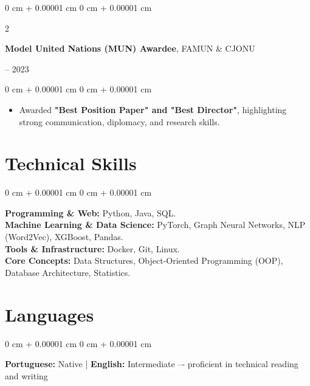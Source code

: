 \documentclass[10pt, letterpaper]{article}
\newenvironment{highlights}{
    \begin{itemize}[
        topsep=0.10 cm,
        parsep=0.10 cm,
        partopsep=0pt,
        itemsep=0pt,
        leftmargin=0 cm + 10pt
    ]
}{
    \end{itemize}
} %
\newenvironment{onecolentry}{
    \begin{adjustwidth}{
        0 cm + 0.00001 cm
    }{
        0 cm + 0.00001 cm
    }
}{
    \end{adjustwidth}
} %
\newenvironment{twocolentry}[2][]{
    \onecolentry
    \def\secondColumn{#2}
    \setcolumnwidth{\fill, 4.5 cm}
    \begin{paracol}{2}
}{
    \switchcolumn \raggedleft \secondColumn
    \end{paracol}
    \endonecolentry
} %
\begin{document}
\vspace{0.20 cm}
\begin{twocolentry}{
    2022 – 2023
}
    \textbf{Model United Nations (MUN) Awardee}, FAMUN \& CJONU
\end{twocolentry}

\vspace{0.10 cm}
\begin{onecolentry}
    \begin{highlights}
        \setlength{\rightskip}{1.0cm}
        \setlength{\leftskip}{0.3cm}
        \item Awarded \textbf{"Best Position Paper" and "Best Director"}, highlighting strong communication, diplomacy, and research skills.
    \end{highlights}
\end{onecolentry}

\vspace{0.15 cm}
\section{Technical Skills}

\begin{onecolentry}
    \textbf{Programming \& Web:} Python, Java, SQL. \\
    \textbf{Machine Learning \& Data Science:} PyTorch, Graph Neural Networks, NLP (Word2Vec), XGBoost, Pandas. \\
    \textbf{Tools \& Infrastructure:} Docker, Git, Linux. \\
    \textbf{Core Concepts:} Data Structures, Object-Oriented Programming (OOP), Database Architecture, Statistics.
\end{onecolentry}
\vspace{0.15 cm}
\section{Languages}

\begin{onecolentry}
    \textbf{Portuguese:} Native \hspace{0.5cm} | \hspace{0.5cm} \textbf{English:} Intermediate –- proficient in technical reading and writing
\end{onecolentry}
    
\end{document}
